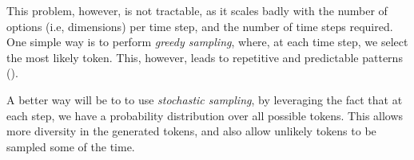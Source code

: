 
\par This problem, however, is not tractable, as it scales badly with the number of options (i.e, dimensions) per time step, and the number of time steps required. One simple way is to perform \textit{greedy sampling}, where, at each time step, we select the most likely token. This, however, leads to repetitive and predictable patterns (\citep{chollet2017book}).

\par A better way will be to to use \textit{stochastic sampling}, by leveraging the fact that at each step, we have a probability distribution over all possible tokens. This allows more diversity in the generated tokens, and also allow unlikely tokens to be sampled some of the time.

